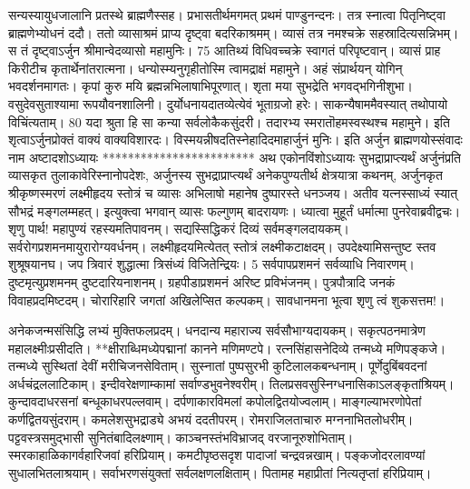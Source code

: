 सन्यस्यायुधजालानि प्रतस्थे ब्राह्मणैस्सह।
 प्रभासतीर्थमगमत् प्रथमं पाण्डुनन्दनः।
 तत्र स्नात्वा पितृनिष्ट्वा ब्राह्मणेभ्योधनं ददौ।
 ततो व्यासाश्रमं प्राप्य दृष्ट्वा बदरिकाश्रमम्।
 व्यासं तत्र नमश्चक्रे सहस्रादित्यसन्निभम्।
 स तं दृष्ट्वाऽर्जुन श्रीमान्वेदव्यासो महामुनिः।
 75 आतिथ्यं विधिवच्चक्रे स्वागतं परिपृष्टवान्।
 व्यासं प्राह किरीटीच कृतार्थेनांतरात्मना।
 धन्योस्म्यनुगृहीतोस्मि त्वामद्राक्षं महामुने।
 अहं संप्रार्थयन् योगिन् भवदर्शनमागतः।
 कृपां कुरु मयि ब्रह्मन्नभिलाषाभिपूरणात्।
 शृता मया सुभद्रेति भगवद्भगिनीशुभा।
 वसुदेवसुताश्यामा रूपयौवनशालिनी।
 दुर्योधनायदातव्येत्येवं भूताग्रजो हरेः।
 साकन्यैषाममैवस्यात् तथोपायो विचिंत्यताम्।
 80 यदा श्रुता हि सा कन्या सर्वलोकैकसुंदरी।
 तदारभ्य स्मरातॊहमस्वस्थश्च महामुने।
 इति शृत्वाऽर्जुनप्रोक्तं वाक्यं वाक्यविशारदः।
 विस्मयन्नीषदतिस्नेहादिदमाहार्जुनं मुनिः।
 इति अर्जुन ब्राह्मणयोस्संवादः नाम
अष्टादशोऽध्यायः
************************
अथ एकोनविंशोऽध्यायः सुभद्राप्राप्त्यर्थं अर्जुनंप्रति व्यासकृत तुलाकावेरिस्नानोपदेशः, अर्जुनस्य सुभद्राप्राप्त्यर्थं अनेकपुण्यतीर्थ क्षेत्रयात्रा कथनम्, अर्जुनकृत
श्रीकृष्णस्मरणं लक्ष्मीहृदय स्तोत्रं च
व्यासः
अभिलाषो महानेष दुष्पारस्ते धनञ्जय।
 अतीव यत्नस्साध्यं स्यात् सौभद्रं मङ्गलम्महत्।
 इत्युक्त्वा भगवान् व्यासः फल्गुणम् बादरायणः।
 ध्यात्वा मुहूर्तं धर्मात्मा पुनरेवाब्रवीद्वचः।
 शृणु पार्थ! महापुण्यं रहस्यमतिपावनम्।
 सद्यस्सिद्धिकरं दिव्यं सर्वमङ्गलदायकम्।
 सर्वरोगप्रशमनमायुरारोग्यवर्धनम्।
 लक्ष्मीहृदयमित्येतत् स्तोत्रं लक्ष्मीकटाक्षदम्।
 उपदेक्ष्यामिसन्तुष्ट स्तव शुश्रूषयानघ।
 जप त्रिवारं शुद्धात्मा त्रिसंध्यं विजितेन्द्रियः।
 5 सर्वपापप्रशमनं सर्वव्याधि निवारणम्।
 दुष्टमृत्युप्रशमनम् दुष्टदारियनाशनम्।
 ग्रहपीडाप्रशमनं अरिष्ट प्रविभंजनम्।
 पुत्रपौत्रादि जनकं विवाहप्रदमिष्टदम्।
 चोरारिहारि जगतां अखिलेप्सित कल्पकम्।
 सावधानमना भूत्वा शृणु त्वं शुकसत्तम!।
 
अनेकजन्मसंसिद्धि लभ्यं मुक्तिफलप्रदम्।
 धनदान्य महाराज्य सर्वसौभाग्यदायकम्।
 सकृत्पठनमात्रेण महालक्ष्मीःप्रसीदति।
 **क्षीराब्धिमध्येपद्मानां कानने मणिमण्टपे।
 रत्नसिंहासनेदिव्ये तन्मध्ये मणिपङ्कजे।
 तन्मध्ये सुस्थितां देवीं मरीचिजनसेविताम्।
 सुस्नातां पुष्पसुरभी कुटिलालकबन्धनाम्।
 पूर्णेदुबिंबवदनां अर्धचंद्रललाटिकाम्।
 इन्दीवरेक्षणाम्कामां सर्वाण्डभुवनेश्वरीम्।
 तिलप्रसवसुस्निग्धनासिकाऽलङ्कृतांश्रियम्।
 कुन्दावदाधरसनां बन्धूकाधरपल्लवाम्।
 दर्पणाकारविमलां कपोलद्वितयोज्वलाम्।
 माङ्गल्याभरणोपेतां कर्णद्वितयसुंदराम्।
 कमलेशसुभद्राड्ये अभयं ददतीपरम्।
 रोमराजिलताचारु मग्ननाभितलोधरीम्।
 पट्टवस्त्रसमुद्भासी सुनितंबादिलक्ष्णाम्।
 काञ्चनस्तंभविभ्राजद् वरजानूरुशोभिताम्।
 स्मरकाहाळिकागर्वहारिजवां हरिप्रियाम्।
 कमटीपृष्ठसदृश पादाजां चन्द्रवन्नखाम्।
 पङ्कजोदरलावण्यां सुधालभितलाश्रयाम्।
 सर्वाभरणसंयुक्तां सर्वलक्षणलक्षिताम्।
 पितामह महाप्रीतां नित्यतृप्तां हरिप्रियाम्।
 
